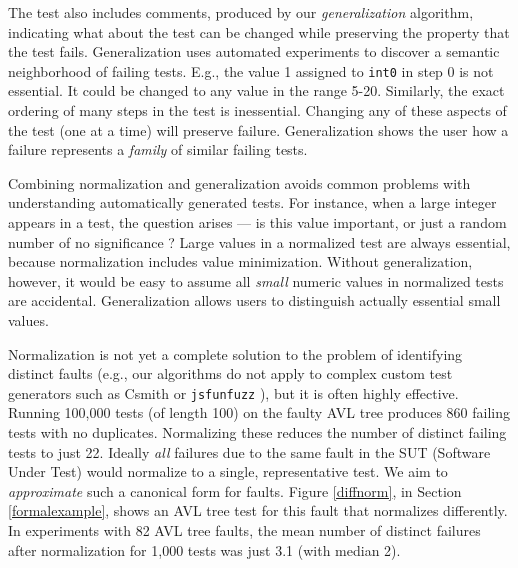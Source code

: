 The test also includes comments, produced by our
\emph{generalization} \cite{SmartCheck} algorithm, indicating what
about the test can be changed while preserving the property that
the test fails.  Generalization uses automated experiments to discover
a semantic neighborhood of failing tests.  E.g.,
the value 1 assigned to {\tt int0} in step 0 is not essential.  It
could be changed to any value in the range 5-20.  Similarly, the exact ordering of many steps in the test
is inessential.   Changing any
of these aspects of the test (one at a time)
will preserve failure.  Generalization shows 
the user how a failure represents  a
\emph{family} of similar failing tests.

Combining normalization and generalization avoids common problems
with understanding automatically generated tests.  For instance,
when a large integer appears in a test, the question
arises --- is this value important, or just a random number of
no significance \cite{MakeMost}?  Large
values in a normalized test are always essential, because normalization includes value minimization.
Without generalization, however, it would be
easy to assume all \emph{small} numeric values in normalized
tests are accidental.  Generalization allows users to
distinguish actually essential small values.

Normalization is not yet a complete solution to the problem of identifying
distinct faults (e.g., our algorithms do not apply to complex custom
test generators such as Csmith \cite{csmith} or {\tt jsfunfuzz}
\cite{jsfunfuzz}), but it is often highly effective.  Running 100,000
tests (of length 100) on the faulty AVL tree produces 860 failing tests with no duplicates.  Normalizing these reduces the number of
distinct failing tests to just 22.  Ideally \emph{all} failures
due to the same fault in the SUT (Software Under Test) would normalize
to a single, representative test.  We aim to
\emph{approximate} such a canonical form for faults.  Figure \ref{diffnorm},
in Section \ref{formalexample}, shows an AVL tree test for this fault that
normalizes differently.  
 In experiments with 82 AVL tree faults,
the mean number of distinct failures after normalization for 1,000
tests was just 3.1 (with median 2). 


